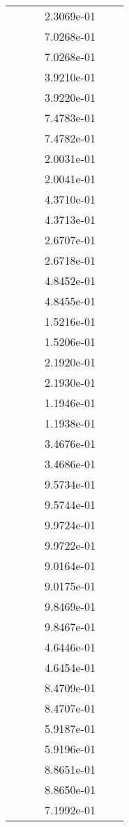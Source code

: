 \begin{xltabular}{\textwidth}{r|rS[table-format=1.3e+2]S[table-format=1.4e+2]S[table-format=1.4e+2]S[table-format=-1.5]}
&  &  & 2.3069e-01 & & \\
&  &  & 7.0268e-01 & & \\
&  &  & 7.0268e-01 & & \\
&  &  & 3.9210e-01 & & \\
&  &  & 3.9220e-01 & & \\
&  &  & 7.4783e-01 & & \\
&  &  & 7.4782e-01 & & \\
&  &  & 2.0031e-01 & & \\
&  &  & 2.0041e-01 & & \\
&  &  & 4.3710e-01 & & \\
&  &  & 4.3713e-01 & & \\
&  &  & 2.6707e-01 & & \\
&  &  & 2.6718e-01 & & \\
&  &  & 4.8452e-01 & & \\
&  &  & 4.8455e-01 & & \\
&  &  & 1.5216e-01 & & \\
&  &  & 1.5206e-01 & & \\
&  &  & 2.1920e-01 & & \\
&  &  & 2.1930e-01 & & \\
&  &  & 1.1946e-01 & & \\
&  &  & 1.1938e-01 & & \\
&  &  & 3.4676e-01 & & \\
&  &  & 3.4686e-01 & & \\
&  &  & 9.5734e-01 & & \\
&  &  & 9.5744e-01 & & \\
&  &  & 9.9724e-01 & & \\
&  &  & 9.9722e-01 & & \\
&  &  & 9.0164e-01 & & \\
&  &  & 9.0175e-01 & & \\
&  &  & 9.8469e-01 & & \\
&  &  & 9.8467e-01 & & \\
&  &  & 4.6446e-01 & & \\
&  &  & 4.6454e-01 & & \\
&  &  & 8.4709e-01 & & \\
&  &  & 8.4707e-01 & & \\
&  &  & 5.9187e-01 & & \\
&  &  & 5.9196e-01 & & \\
&  &  & 8.8651e-01 & & \\
&  &  & 8.8650e-01 & & \\
&  &  & 7.1992e-01 & & \\

\end{xltabular}
